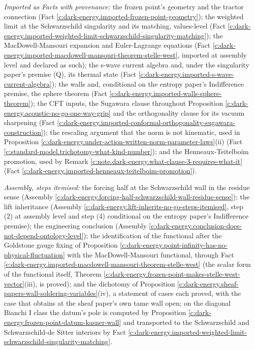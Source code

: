 \documentclass[11pt]{article}
\theoremstyle{definition}
\theoremstyle{plain}
\begin{document}
\emph{Imported as Facts with provenance:} the frozen point's geometry and the tractor connection (Fact \ref{c:dark-energy.imported-frozen-point-geometry}); the weighted limit at the Schwarzschild singularity and its matching, values-level (Fact \ref{c:dark-energy.imported-weighted-limit-schwarzschild-singularity-matching}); the MacDowell-Mansouri expansion and Euler-Lagrange equations (Fact \ref{c:dark-energy.imported-macdowell-mansouri-theorem-stelle-west}, imported at assembly level and declared as such); the s-wave current algebra and, under the singularity paper's premise (Q), its thermal state (Fact \ref{c:dark-energy.imported-s-wave-current-algebra}); the walls and, conditional on the entropy paper's Indifference premise, the sphere theorem (Fact \ref{c:dark-energy.imported-walls-sphere-theorem}); the CFT inputs, the Sugawara clause throughout Proposition \ref{c:dark-energy.acoustic-no-go-one-way-grip} and the orthogonality clause for its vacuum sharpening (Fact \ref{c:dark-energy.imported-conformal-orthogonality-sugawara-construction}); the rescaling argument that the norm is not kinematic, used in Proposition \ref{c:dark-energy.under-action-written-norm-parameter-laws}(ii) (Fact \ref{c:standard-model.trichotomy-what-kind-number}); and the Henneaux-Teitelboim promotion, used by Remark \ref{c:note.dark-energy.what-clause-3-requires-what-it} (Fact \ref{c:dark-energy.imported-henneaux-teitelboim-promotion}).

\emph{Assembly, steps itemised:} the forcing half at the Schwarzschild wall in the residue sense (Assembly \ref{c:dark-energy.forcing-half-schwarzschild-wall-residue-sense}); the lift inheritance (Assembly \ref{c:dark-energy.lift-inherits-no-go-steps-itemised}, step (2) at assembly level and step (4) conditional on the entropy paper's Indifference premise); the engineering conclusion (Assembly \ref{c:dark-energy.conclusion-does-not-depend-ontology-level}); the identification of the functional after the Goldstone gauge fixing of Proposition \ref{c:dark-energy.point-infinity-has-no-physical-fluctuation} with the MacDowell-Mansouri functional, through Fact \ref{c:dark-energy.imported-macdowell-mansouri-theorem-stelle-west} (the scalar form of the functional itself, Theorem \ref{c:dark-energy.frozen-point-makes-stelle-west-vector}(iii), is proved); and the dichotomy of Proposition \ref{c:dark-energy.sheaf-papers-wall-soldering-variables}(iv), a statement of cases each proved, with the case that obtains at the sheaf paper's own tame wall open; on the diagonal Bianchi I class the datum's pole is computed by Proposition \ref{c:dark-energy.frozen-point-datum-kasner-wall} and transported to the Schwarzschild and Schwarzschild-de Sitter interiors by Fact \ref{c:dark-energy.imported-weighted-limit-schwarzschild-singularity-matching}.
\end{document}
